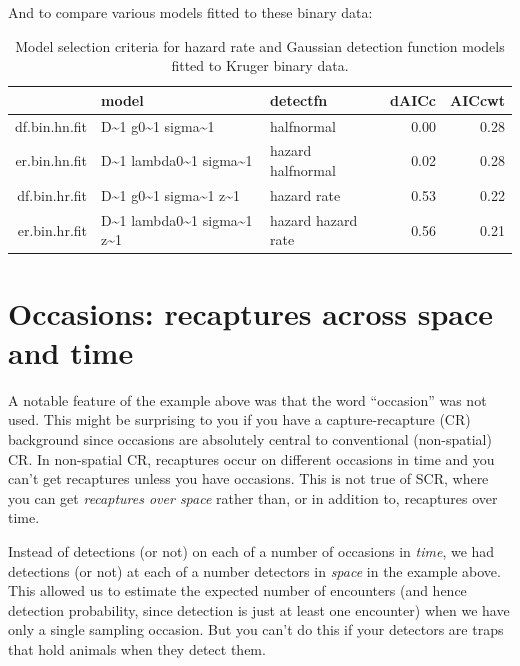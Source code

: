 \documentclass[graybox,envcountchap,sectrefs]{SpringerStyleFiles/styles/svmono}\usepackage[]{graphicx}\usepackage[]{color}
\begin{document}
And to compare various models fitted to these binary data:
{\small
\begin{table}[ht]
\centering
\begin{tabular}{rllrr}
  \hline
 & model & detectfn & dAICc & AICcwt \\ 
  \hline
df.bin.hn.fit & D\~{}1 g0\~{}1 sigma\~{}1 & halfnormal & 0.00 & 0.28 \\ 
  er.bin.hn.fit & D\~{}1 lambda0\~{}1 sigma\~{}1 & hazard halfnormal & 0.02 & 0.28 \\ 
  df.bin.hr.fit & D\~{}1 g0\~{}1 sigma\~{}1 z\~{}1 & hazard rate & 0.53 & 0.22 \\ 
  er.bin.hr.fit & D\~{}1 lambda0\~{}1 sigma\~{}1 z\~{}1 & hazard hazard rate & 0.56 & 0.21 \\ 
   \hline
\end{tabular}
\caption{Model selection criteria for hazard rate and Gaussian detection function models fitted to Kruger binary data.} 
\label{tab:ERdetfun.detfn.binarymodsel}
\end{table}

}




\section{Occasions: recaptures across space and time}
\label{sec:ER+detfun.occasions}

A notable feature of the example above was that the word ``occasion'' was not used. This might be surprising to you if you have a capture-recapture (CR) background since occasions are absolutely central to conventional (non-spatial) CR. In non-spatial CR, recaptures occur on different occasions in time and you can't get recaptures unless you have occasions. This is not true of SCR, where you can get \textit{recaptures over space} rather than, or in addition to, recaptures over time.

Instead of detections (or not) on each of a number of occasions in \textit{time}, we had detections (or not) at each of a number detectors in \textit{space} in the example above. This allowed us to estimate the expected number of encounters (and hence detection probability, since detection is just at least one encounter) when we have only a single sampling occasion. But you can't do this if your detectors are traps that hold animals when they detect them. 
\end{document}
